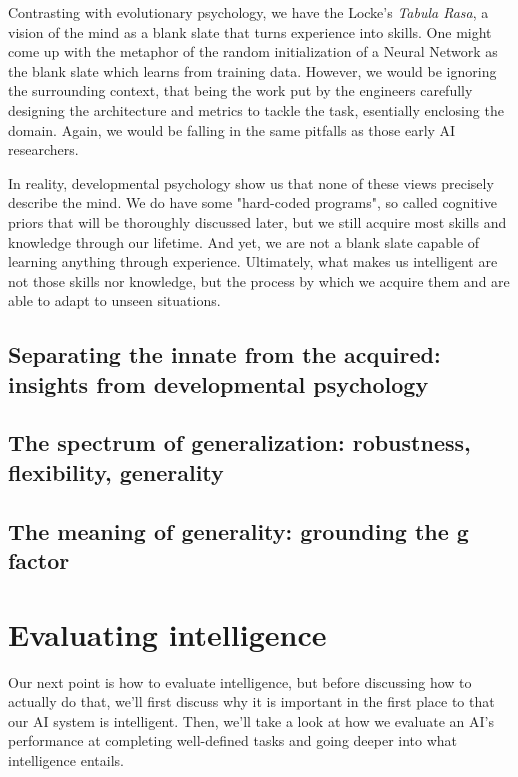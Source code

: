    \begin{flushleft}
        Contrasting with evolutionary psychology, we have the Locke's \textit{Tabula Rasa}, a vision of the mind as a blank slate that turns experience into skills. One might come up with the metaphor of the random initialization of a Neural Network as the blank slate which learns from training data. However, we would be ignoring the surrounding context, that being the work put by the engineers carefully designing the architecture and metrics to tackle the task, esentially enclosing the domain. Again, we would be falling in the same pitfalls as those early AI researchers.
    \end{flushleft}

    \begin{flushleft}
        In reality, developmental psychology show us that none of these views precisely describe the mind. We do have some "hard-coded programs", so called cognitive priors that will be thoroughly discussed later, but we still acquire most skills and knowledge through our lifetime. And yet, we are not a blank slate capable of learning anything through experience. Ultimately, what makes us intelligent are not those skills nor knowledge, but the process by which we acquire them and are able to adapt to unseen situations.
    \end{flushleft}

    \subsection{Separating the innate from the acquired: insights from developmental psychology}
    \subsection{The spectrum of generalization: robustness, flexibility, generality}
    \subsection{The meaning of generality: grounding the g factor}

    

\section{Evaluating intelligence}


    \begin{flushleft}
        Our next point is how to evaluate intelligence, but before discussing how to actually do that, we'll first discuss why it is important in the first place to that our AI system is intelligent. Then, we'll take a look at how we evaluate an AI's performance at completing well-defined tasks and going deeper into what intelligence entails.
    \end{flushleft}

